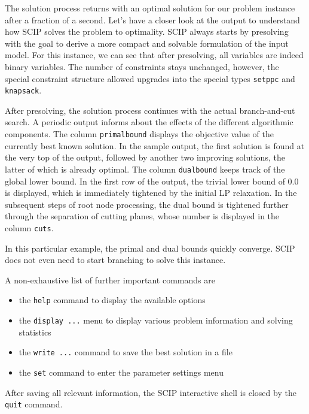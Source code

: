 \documentclass[a4paper,10pt]{article}
\begin{document}


The solution process returns with an optimal solution for our problem instance after a fraction of a second.
%
Let's have a closer look at the output to understand how SCIP solves the problem to optimality.
%
SCIP always starts by presolving with the goal to derive a more compact and solvable
formulation of the input model.
%
For this instance, we can see that after presolving, all variables are indeed binary variables.
%
The number of constraints stays unchanged, however, the special
constraint structure allowed upgrades into the special types \texttt{setppc} and \texttt{knapsack}.

After presolving, the solution process continues with the actual branch-and-cut search.
%
A periodic output informs about the effects of the different algorithmic components.
%
The column \texttt{primalbound} displays the objective value of the currently best known solution.
%
In the sample output, the first solution is found at the very top of the output, followed by
another two improving solutions, the latter of which is already optimal.
%
The column \texttt{dualbound} keeps track of the global lower bound.
%
In the first row of the output, the trivial lower bound of 0.0 is displayed, which is immediately tightened
by the initial LP relaxation.
%
In the subsequent steps of root node processing, the dual bound is tightened further through the separation
of cutting planes, whose number is displayed in the column \texttt{cuts}.

In this particular example, the primal and dual bounds quickly converge.
%
SCIP does not even need to start branching to solve this instance.
%

A non-exhaustive list of further important commands are

\begin{itemize}
  \item the \texttt{help} command to display the available options
  \item the \texttt{display ...} menu to display various problem information and solving statistics
  \item the \texttt{write ...} command to save the best solution in a file
  \item the \texttt{set} command to enter the parameter settings menu
\end{itemize}

After saving all relevant information, the SCIP interactive shell is closed by the \texttt{quit} command.
\end{document}
